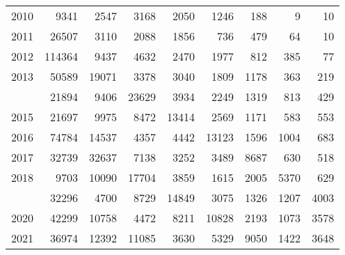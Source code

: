 \documentclass[
]{article}
\begin{document}
\begin{longtable}[t]{lrrrrrrrr}
2010 & 9341 & 2547 & 3168 & 2050 & 1246 & 188 & 9 & 10\\
2011 & 26507 & 3110 & 2088 & 1856 & 736 & 479 & 64 & 10\\
2012 & 114364 & 9437 & 4632 & 2470 & 1977 & 812 & 385 & 77\\
2013 & 50589 & 19071 & 3378 & 3040 & 1809 & 1178 & 363 & 219\\
\addlinespace
2014 & 21894 & 9406 & 23629 & 3934 & 2249 & 1319 & 813 & 429\\
2015 & 21697 & 9975 & 8472 & 13414 & 2569 & 1171 & 583 & 553\\
2016 & 74784 & 14537 & 4357 & 4442 & 13123 & 1596 & 1004 & 683\\
2017 & 32739 & 32637 & 7138 & 3252 & 3489 & 8687 & 630 & 518\\
2018 & 9703 & 10090 & 17704 & 3859 & 1615 & 2005 & 5370 & 629\\
\addlinespace
2019 & 32296 & 4700 & 8729 & 14849 & 3075 & 1326 & 1207 & 4003\\
2020 & 42299 & 10758 & 4472 & 8211 & 10828 & 2193 & 1073 & 3578\\
2021 & 36974 & 12392 & 11085 & 3630 & 5329 & 9050 & 1422 & 3648\\*
\end{longtable}
\end{document}
